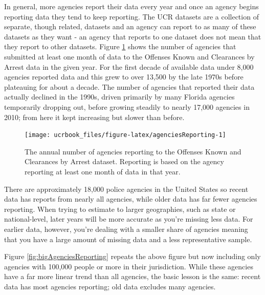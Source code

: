 \documentclass[
  12pt,
  openany]{book}
\begin{document}
In general, more agencies report their data every year and once an agency begins reporting data they tend to keep reporting. The UCR datasets are a collection of separate, though related, datasets and an agency can report to as many of these datasets as they want - an agency that reports to one dataset does not mean that they report to other datasets. Figure \ref{fig:agenciesReporting} shows the number of agencies that submitted at least one month of data to the Offenses Known and Clearances by Arrest data in the given year. For the first decade of available data under 8,000 agencies reported data and this grew to over 13,500 by the late 1970s before plateauing for about a decade. The number of agencies that reported their data actually declined in the 1990s, driven primarily by many Florida agencies temporarily dropping out, before growing steadily to nearly 17,000 agencies in 2010; from here it kept increasing but slower than before.

\begin{figure}

{\centering \texttt{[image: ucrbook\_files/figure-latex/agenciesReporting-1]} 

}

\caption{The annual number of agencies reporting to the Offenses Known and Clearances by Arrest dataset. Reporting is based on the agency reporting at least one month of data in that year.}\label{fig:agenciesReporting}
\end{figure}

There are approximately 18,000 police agencies in the United States so recent data has reports from nearly all agencies, while older data has far fewer agencies reporting. When trying to estimate to larger geographies, such as state or national-level, later years will be more accurate as you're missing less data. For earlier data, however, you're dealing with a smaller share of agencies meaning that you have a large amount of missing data and a less representative sample.

Figure \ref{fig:bigAgenciesReporting} repeats the above figure but now including only agencies with 100,000 people or more in their jurisdiction. While these agencies have a far more linear trend than all agencies, the basic lesson is the same: recent data has most agencies reporting; old data excludes many agencies.
\end{document}

